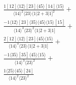 \documentclass[varwidth, border=5pt]{standalone}
\begin{document}
\begin{my}
$\begin{gathered}
\scriptscriptstyle\frac{1[12]⟨12⟩[23]⟨45⟩[14]⟨15⟩}{⟨14⟩^2⟨23⟩⟨1|2+3|1]^2}+\\
\scriptscriptstyle\frac{-1⟨12⟩[23]⟨35⟩⟨45⟩⟨15⟩[15]}{⟨14⟩^3⟨23⟩^2⟨1|2+3|1]}+\\
\scriptscriptstyle\frac{2[12]⟨12⟩[23]⟨45⟩⟨15⟩}{⟨14⟩^3⟨23⟩⟨1|2+3|1]}+\\
\scriptscriptstyle\frac{-1⟨35⟩[35]⟨45⟩⟨15⟩}{⟨14⟩^3⟨23⟩^2}+\\
\scriptscriptstyle\frac{1⟨25⟩⟨45⟩[24]}{⟨14⟩^2⟨23⟩^2}\phantom{+}
\end{gathered}$
\end{my}
\end{document}

